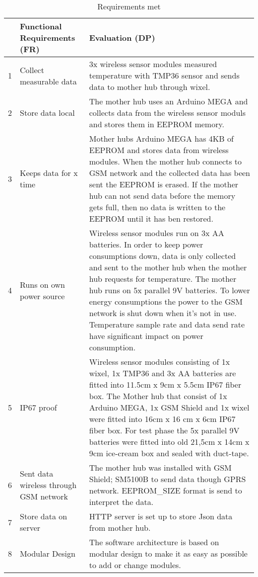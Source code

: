  \begin{table}[H]
 	\caption{Requirements met}
 	\label{tbl:FR-Eva}
 	\begin{tabular}{|l|p{4cm}| p{} |}
 		
 		\hline
 		& \textbf{Functional Requirements (FR)}  & \textbf{Evaluation (DP)} \\  
 		\hline 1 &  Collect measurable data & 3x wireless sensor modules measured temperature with  TMP36 \cite{Devices2010} sensor and sends data to mother hub through wixel. \\ 
 		           		
 		\hline 2 & Store data local &   The mother hub uses an Arduino MEGA and collects data from the wireless sensor moduls and stores them in EEPROM memory. \\
 	
 		\hline 3 & Keeps data for x time &  Mother hubs Arduino MEGA \cite{arduinoMega} has 4KB of EEPROM and stores  data from wireless modules. When the mother hub connects to GSM network and the collected data has been sent the EEPROM is erased. If the mother hub can not send data before the memory gets full, then no data is written to the EEPROM until it has ben restored.  \\
 	
 		\hline 4 & Runs on own power source & Wireless sensor modules run on 3x AA batteries. In order to keep power consumptions down, data is only collected and sent to the mother hub when the mother hub requests for temperature. The mother hub runs on 5x parallel 9V batteries.  To lower energy consumptions the power to the GSM network is shut down when it's not in use. Temperature sample rate and data send rate have significant impact on power consumption. \\ 
 	
 		\hline 5 & IP67 proof &   Wireless sensor modules consisting of 1x wixel, 1x TMP36 and 3x AA batteries are fitted into 11.5cm x 9cm x 5.5cm IP67 fiber box. The Mother hub that consist of 1x Arduino MEGA, 1x GSM Shield and 1x wixel were fitted into 16cm x 16 cm x 6cm IP67 fiber box. For test phase the 5x parallel 9V batteries were fitted into old 21,5cm x 14cm x 9cm ice-cream box and sealed with duct-tape. \\
 	
 		\hline 6 & Sent data wireless through GSM network & The mother hub was installed with GSM Shield; SM5100B\cite{SM5100B} to send data though GPRS network. EEPROM\_SIZE format is send to interpret the data. \\ 
 	
 		\hline 7 & Store data on server & HTTP server is set up to store Json data from mother hub. \\ 
 	
 		\hline 8 & Modular Design & The software architecture is based on modular design to make it as easy as possible to add or change modules.  \\
 		\hline
 	\end{tabular}
 \end{table}

